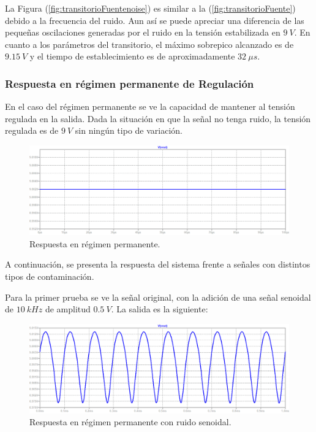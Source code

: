 La Figura (\ref{fig:transitorioFuentenoise}) es similar a la (\ref{fig:transitorioFuente}) debido a la frecuencia del ruido. Aun así se puede apreciar una diferencia de las pequeñas oscilaciones generadas por el ruido en la tensión estabilizada en $9 \ V$. En cuanto a los parámetros del transitorio, el máximo sobrepico alcanzado es de $9.15 \ V$ y el tiempo de establecimiento es de aproximadamente $32 \ \mu s$.

\subsubsection{Respuesta en régimen permanente de Regulación}
En el caso del régimen permanente se ve la capacidad de mantener al tensión regulada en la salida. Dada la situación en que la señal no tenga ruido, la tensión regulada es de $9 \ V$ sin ningún tipo de variación.
\begin{figure}[H]
\centering
	\includegraphics[width=1\textwidth]{ImagenesEjercicio2/permresp.png}
	\caption{Respuesta en régimen permanente.}
	\label{fig:permanenteFuente}
\end{figure}

A continuación, se presenta la respuesta del sistema frente a señales con distintos tipos de contaminación.

Para la primer prueba se ve la señal original, con la adición de una señal senoidal de $10 \ kHz$ de amplitud $0.5 \ V$. La salida es la siguiente:
\begin{figure}[H]
\centering
	\includegraphics[width=1\textwidth]{ImagenesEjercicio2/permrespsine.png}
	\caption{Respuesta en régimen permanente con ruido senoidal.}
	\label{fig:permanenteFuentesine}
\end{figure}

